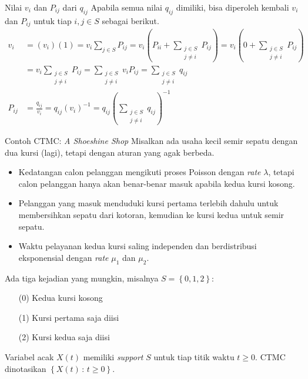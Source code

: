 \documentclass{beamer}
\newcommand{\pars}[1]{\left(#1\right)}
\newcommand{\braces}[1]{\left\{#1\right\}}
\begin{document}
\begin{frame}{Nilai \(v_i\) dan \(P_{ij}\) dari \(q_{ij}\)}
    Apabila semua nilai \(q_{ij}\) dimiliki, bisa diperoleh kembali \(v_i\) dan \(P_{ij}\) untuk tiap \(i,j \in S\) sebagai berikut.
    \begin{align*}
        v_i &= \pars{v_i}(1) = v_i \sum_{j\in S} P_{ij} = v_i \pars{P_{ii} + \sum_{\substack{j\in S \\ j \ne i}} P_{ij}} = v_i \pars{0 + \sum_{\substack{j\in S \\ j \ne i}} P_{ij}} \\
        &= v_i \sum_{\substack{j\in S \\ j \ne i}} P_{ij} = \sum_{\substack{j\in S \\ j \ne i}} v_i P_{ij} = \sum_{\substack{j\in S \\ j \ne i}} q_{ij} \\
        P_{ij} &= \frac{q_{ij}}{v_i} = q_{ij} \pars{v_i}^{-1} = q_{ij} \pars{\sum_{\substack{j\in S \\ j \ne i}} q_{ij}}^{-1}
    \end{align*}
\end{frame}

\begin{frame}{Contoh CTMC: \textit{A Shoeshine Shop}}
    Misalkan ada usaha kecil semir sepatu dengan dua kursi (lagi), tetapi dengan aturan yang agak berbeda.
    \begin{itemize}
        \item Kedatangan calon pelanggan mengikuti proses Poisson dengan \textit{rate} \(\lambda\), tetapi calon pelanggan hanya akan benar-benar masuk apabila kedua kursi kosong.
        \item Pelanggan yang masuk menduduki kursi pertama terlebih dahulu untuk membersihkan sepatu dari kotoran, kemudian ke kursi kedua untuk semir sepatu.
        \item Waktu pelayanan kedua kursi saling independen dan berdistribusi eksponensial dengan \textit{rate} \(\mu_1\) dan \(\mu_2\).
    \end{itemize}
    Ada tiga kejadian yang mungkin, misalnya \(S=\braces{0,1,2}\):
    \begin{enumerate}
        \item[(0)] Kedua kursi kosong
        \item[(1)] Kursi pertama saja diisi
        \item[(2)] Kursi kedua saja diisi
    \end{enumerate}
    Variabel acak \(X(t)\) memiliki \textit{support} \(S\) untuk tiap titik waktu \(t \ge 0\). CTMC dinotasikan \(\braces{X(t) \, : \, t \ge 0}\).
\end{frame}
\end{document}
